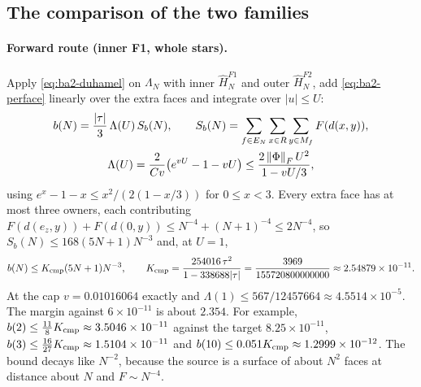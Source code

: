 \subsection{The comparison of the two families}
\label{sec:ba2-comparison}
\paragraph{Forward route (inner F1, whole stars).} Apply
\eqref{eq:ba2-duhamel} on $\Lambda_N$ with inner $\widehat H^{F1}_N$ and outer
$\widehat H^{F2}_N$, add \eqref{eq:ba2-perface} linearly over the extra faces
and integrate over $|u|\le U$:
\begin{equation}
 \begin{gathered}
 b(N)=\frac{|\tau|}{3}\,\Lambda(U)\,S_b(N),\qquad
 S_b(N)=\sum_{f\in E_N}\sum_{x\in R}\sum_{y\in M_f}F(d(x,y)),\\
 \Lambda(U)=\frac{2}{Cv}\bigl(e^{vU}-1-vU\bigr)\le\frac{2\left\lVert\Phi\right\rVert_FU^2}{1-vU/3},
 \end{gathered}
 \label{eq:ba2-forward}
\end{equation}
using $e^x-1-x\le x^2/(2(1-x/3))$ for $0\le x<3$. Every extra face has at most
three owners, each contributing
$F(d(e_z,y))+F(d(0,y))\le N^{-4}+(N+1)^{-4}\le2N^{-4}$, so
$S_b(N)\le168(5N+1)N^{-3}$ and, at $U=1$,
\begin{equation}
 b(N)\le K_{\rm cmp}(5N+1)N^{-3},\qquad
 K_{\rm cmp}=\frac{254016\,\tau^2}{1-338688|\tau|}=\frac{3969}{155720800000000}
 \approx2.54879\times10^{-11}.
 \label{eq:ba2-Kcmp}
\end{equation}
At the cap $v=0.01016064$ exactly and $\Lambda(1)\le567/12457664\approx
4.5514\times10^{-5}$. The margin against $6\times10^{-11}$ is about $2.354$.
For example, $b(2)\le\tfrac{11}8K_{\rm cmp}\approx3.5046\times10^{-11}$
against the target $8.25\times10^{-11}$, $b(3)\le\tfrac{16}{27}K_{\rm cmp}
\approx1.5104\times10^{-11}$ and $b(10)\le0.051K_{\rm cmp}\approx
1.2999\times10^{-12}$. The bound decays like $N^{-2}$, because the source is a
surface of about $N^2$ faces at distance about $N$ and $F\sim N^{-4}$.

